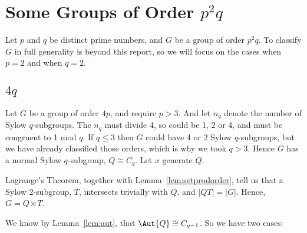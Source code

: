 \section{Some Groups of Order \(p^2q\)}
Let \(p\) and \(q\) be distinct prime numbers, and \(G\) be a group of order \(p^2q\).
To classify \(G\) in full generality is beyond this report, so we will focus on the cases when \(p = 2\) and when \(q =
2\).

\subsection{\(4q\)}
Let \(G\) be a group of order \(4p\), and require \(p > 3\).
And let \(n_q\) denote the number of Sylow \(q\)-subgroups.
The \(n_q\) must divide 4, so could be 1, 2 or 4, and must be congruent to 1 mod \(q\).
If \(q \leqslant 3\) then \(G\) could have 4 or 2 Sylow \(q\)-subgroups, but we have already classified those orders,
which is why we took \(q > 3\).
Hence \(G\) has a normal Sylow \(q\)-subgroup, \(Q \cong C_q\).
Let \(x\) generate \(Q\).

Lagrange's Theorem, together with Lemma~\ref{lem:setprodorder}, tell us that a Sylow 2-subgroup, \(T\), intersects
trivially with \(Q\), and \(|QT| = |G|\).
Hence, \(G = Q \rtimes T\).

We know by Lemma~\ref{lem:aut}, that \(\Aut{Q} \cong C_{q-1}\).
So we have two cases:

